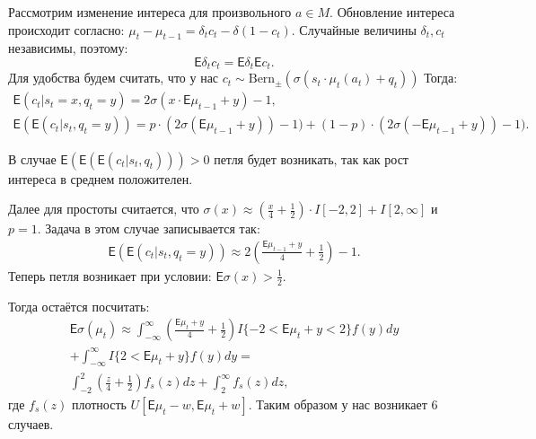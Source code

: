 \documentclass[12pt, twoside]{article}
\begin{document}
Рассмотрим изменение интереса для произвольного $a \in M$. 
Обновление интереса происходит согласно: $\mu_t - \mu_{t-1} = \delta_t c_t - \delta (1 - c_t)$.
Случайные величины $\delta_t, c_t$ независимы, поэтому: \[\mathsf{E} \delta_t c_t = \mathsf{E} \delta_t \mathsf{E} c_t.\] 
Для удобства будем считать, что у нас $c_t \sim \text{Bern}_{\pm}(\sigma(s_t \cdot \mu_t(a_t) + q_t))$
Тогда: 
\begin{gather*}
  \mathsf{E} (c_t | s_t = x, q_t = y) = 2 \sigma(x \cdot \mathsf{E} \mu_{t-1} + y) - 1, \\
  \mathsf{E} (\mathsf{E} (c_t | s_t, q_t = y)) = p \cdot (2 \sigma(\mathsf{E} \mu_{t-1} + y)) - 1) +  (1-p) \cdot (2 \sigma(- \mathsf{E}\mu_{t-1} + y)) - 1).  
\end{gather*}

В случае $\mathsf{E}(\mathsf{E}(\mathsf{E}(c_t|s_t, q_t))) > 0$ петля будет возникать, так как рост интереса в среднем положителен. 

Далее для простоты считается, что $\sigma(x) \approx \left(\frac{x}{4} + \frac{1}{2} \right) \cdot I[-2, 2] + I[2, \infty]$ и $p = 1$.
Задача в этом случае записывается так:
\begin{gather*}
  \mathsf{E} (\mathsf{E} (c_t | s_t, q_t = y)) \approx  2 \left(\frac{\mathsf{E} \mu_{t-1} + y}{4} + \frac{1}{2}\right) - 1.   
\end{gather*}
Теперь петля возникает при условии: $\mathsf{E}\sigma(x) > \frac{1}{2}$. 

Тогда остаётся посчитать:
\begin{gather*}
  \mathsf{E} \sigma(\mu_t) \approx \int_{-\infty}^{\infty} \left(\frac{\mathsf{E} \mu_t + y}{4} + \frac{1}{2} \right) I\{-2 < \mathsf{E}\mu_t +y < 2\} f(y)dy \\
  + \int_{-\infty}^{\infty} I\{2 < \mathsf{E}\mu_t +y \}f(y) dy = \\
  \int_{-2}^{2} \left(\frac{z}{4} + \frac{1}{2} \right) f_s(z)dz 
  + \int_{2}^{\infty} f_s(z) dz,
\end{gather*}
где $f_s(z)$ плотность $U[\mathsf{E}\mu_t - w, \mathsf{E}\mu_t + w]$.
Таким образом у нас возникает $6$ случаев.
\end{document}

